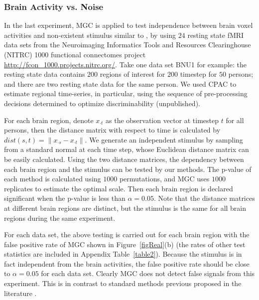 \documentclass[11pt]{article}
\newcommand{\jv}[1]{{\color{red}{#1}}}
\newcommand{\cs}[1]{{\color{blue}{#1}}}
\begin{document}
\subsubsection{Brain Activity vs. Noise}

In the last experiment, MGC is applied to test independence between brain voxel activities and non-existent stimulus similar to \cite{EklundKnutsson2012}, by using $24$ resting state fMRI data sets from the Neuroimaging Informatics Tools and Resources Clearinghouse (NITRC) 1000 functional connectomes project \url{http://fcon_1000.projects.nitrc.org/}. Take one data set BNU1 for example: the resting state data contains $200$ regions of interest for $200$ timestep for $50$ persons; and there are 
two resting state data for the same person. We used CPAC to estimate regional time-series, in particular, using the sequence of pre-processing decisions determined to optimize discriminability (unpublished).

For each brain region, denote $x_{\cdot t}$ as the observation vector at timestep $t$ for all persons, then the distance matrix with respect to time is calculated by $dist(s,t)=\|x_{\cdot s}-x_{\cdot t}\|$. We generate an independent stimulus by sampling from a standard normal at each time step, whose Euclidean distance matrix can be easily calculated. Using the two distance matrices, the dependency between each brain region and the stimulus can be tested by our methods. The p-value of each method is calculated using $1000$ permutations, and MGC uses $1000$ replicates to estimate the optimal scale. \jv{what is this paranthetical comment for? don't we already now this?}
\cs{MGC needs additional MC replicates to estimate the testing power to pick the optimal scale; while $1000$ permutations are used for p-value calculation only}
Then each brain region is declared significant when the p-value is less than $\alpha=0.05$. Note that the distance matrices at different brain regions are distinct, but the stimulus is the same for all brain regions during the same experiment.

For each data set, the above testing is carried out for each brain region with the false positive rate of MGC shown in Figure~\ref{figReal}(b) (the rates of other test statistics are included in Appendix Table~\ref{table2}). Because the stimulus is in fact independent from the brain activities, the false positive rate should be close to $\alpha=0.05$ for each data set. Clearly MGC does not detect false signals from this experiment. This is in contrast to standard methods previous proposed in the literature \cite{EklundKnutsson2012}.
\jv{let's move the table to the appendix, and add just a jittered scatter plot of MGC false positive rate, to include in the other real data figure?}
\cs{done; let me know if you want a better looking scatter plot}
\jv{i do :) can you label the x-axis with the name of the dataset or something? and add a dashed line at p=0.05 for the y-axis.  and make the y scale from 0 to 1 perhaps?}
\cs{tried again}
\end{document}
